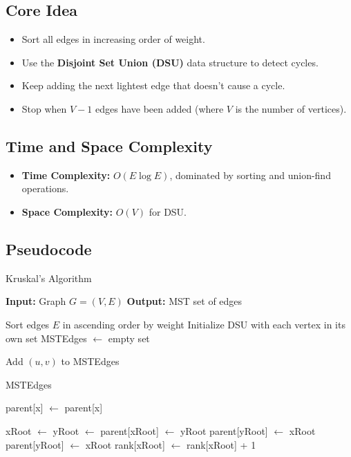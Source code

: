 \documentclass[a4paper,14pt]{extarticle}
\begin{document}
\subsection{Core Idea}
\begin{itemize}
    \item Sort all edges in increasing order of weight.
    \item Use the \textbf{Disjoint Set Union (DSU)} data structure to detect cycles.
    \item Keep adding the next lightest edge that doesn't cause a cycle.
    \item Stop when \(V-1\) edges have been added (where \(V\) is the number of vertices).
\end{itemize}

\subsection*{Time and Space Complexity}
\begin{itemize}
    \item \textbf{Time Complexity:} \(O(E \log E)\), dominated by sorting and union-find operations.
    \item \textbf{Space Complexity:} \(O(V)\) for DSU.
\end{itemize}

\subsection{Pseudocode}

\begin{algorithm}[H]
\caption{Kruskal's Algorithm}
\begin{algorithmic}[1]
\State \textbf{Input:} Graph \(G = (V, E)\)
\State \textbf{Output:} MST set of edges

    \State Sort edges \(E\) in ascending order by weight
    \State Initialize DSU with each vertex in its own set
    \State MSTEdges \(\gets\) empty set

            \State Add \((u, v)\) to MSTEdges
            \State {}
        \EndIf
    \EndFor

    \State \Return MSTEdges
\EndFunction

        \State parent[x] \(\gets\)  
    \EndIf
    \State \Return parent[x]
\EndFunction

    \State xRoot \(\gets\) 
    \State yRoot \(\gets\) 
        \State parent[xRoot] \(\gets\) yRoot
        \State parent[yRoot] \(\gets\) xRoot
    \Else
        \State parent[yRoot] \(\gets\) xRoot
        \State rank[xRoot] \(\gets\) rank[xRoot] + 1
    \EndIf
\EndFunction
\end{algorithmic}
\end{algorithm}
\end{document}
